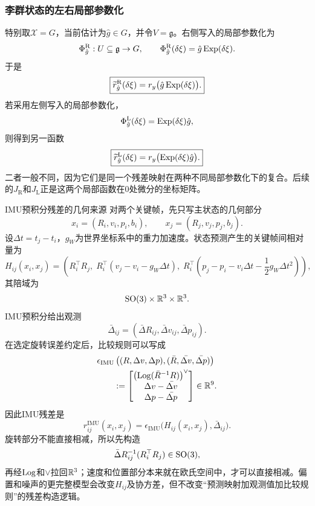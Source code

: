 \subsubsection*{李群状态的左右局部参数化}

特别取$\mathcal X=G$，当前估计为$\hat g\in G$，并令$V=\mathfrak g$。右侧写入的局部参数化为
\[
    \Phi_{\hat g}^{\mathrm R}:U\subseteq\mathfrak g\to G,
    \qquad
    \Phi_{\hat g}^{\mathrm R}(\delta\xi)
    =
    \hat g\operatorname{Exp}(\delta\xi).
\]
于是
\[
    \boxed{
    \widetilde r_{\hat g}^{\mathrm R}(\delta\xi)
    =
    r_y\bigl(\hat g\operatorname{Exp}(\delta\xi)\bigr).
    }
\]
若采用左侧写入的局部参数化，
\[
    \Phi_{\hat g}^{\mathrm L}(\delta\xi)
    =
    \operatorname{Exp}(\delta\xi)\hat g,
\]
则得到另一函数
\[
    \boxed{
    \widetilde r_{\hat g}^{\mathrm L}(\delta\xi)
    =
    r_y\bigl(\operatorname{Exp}(\delta\xi)\hat g\bigr).
    }
\]
二者一般不同，因为它们是同一个残差映射在两种不同局部参数化下的复合。后续的$J_{\mathrm R}$和$J_{\mathrm L}$正是这两个局部函数在$0$处微分的坐标矩阵。

\begin{lieexample}{IMU预积分残差的几何来源}
对两个关键帧，先只写主状态的几何部分
\[
    x_i=(R_i,v_i,p_i,b_i),
    \qquad
    x_j=(R_j,v_j,p_j,b_j).
\]
设$\Delta t=t_j-t_i$，$g_W$为世界坐标系中的重力加速度。状态预测产生的关键帧间相对量为
\[
    H_{ij}(x_i,x_j)
    =
    \left(
    R_i^\top R_j,\;
    R_i^\top(v_j-v_i-g_W\Delta t),\;
    R_i^\top\left(
    p_j-p_i-v_i\Delta t-\frac12g_W\Delta t^2
    \right)
    \right),
\]
其陪域为
\[
    \operatorname{SO}(3)\times\mathbb{R}^3\times\mathbb{R}^3.
\]
IMU预积分给出观测
\[
    \bar\Delta_{ij}
    =
    (\bar\Delta R_{ij},\bar\Delta v_{ij},\bar\Delta p_{ij}).
\]
在选定旋转误差约定后，比较规则可以写成
\[
\begin{aligned}
    &\epsilon_{\mathrm{IMU}}
    \left(
    (R,\Delta v,\Delta p),
    (\bar R,\bar{\Delta v},\bar{\Delta p})
    \right)\\
    &\qquad:=
    \begin{bmatrix}
        \bigl(\operatorname{Log}(\bar R^{-1}R)\bigr)^\vee\\
        \Delta v-\bar{\Delta v}\\
        \Delta p-\bar{\Delta p}
    \end{bmatrix}
    \in\mathbb{R}^9.
\end{aligned}
\]
因此IMU残差是
\[
    \boxed{
    r_{ij}^{\mathrm{IMU}}(x_i,x_j)
    =
    \epsilon_{\mathrm{IMU}}
    \bigl(
    H_{ij}(x_i,x_j),
    \bar\Delta_{ij}
    \bigr).
    }
\]
旋转部分不能直接相减，所以先构造
\[
    \bar\Delta R_{ij}^{-1}(R_i^\top R_j)\in\operatorname{SO}(3),
\]
再经$\operatorname{Log}$和$\vee$拉回$\mathbb{R}^3$；速度和位置部分本来就在欧氏空间中，才可以直接相减。偏置和噪声的更完整模型会改变$H_{ij}$及协方差，但不改变“预测映射加观测值加比较规则”的残差构造逻辑。
\end{lieexample}

